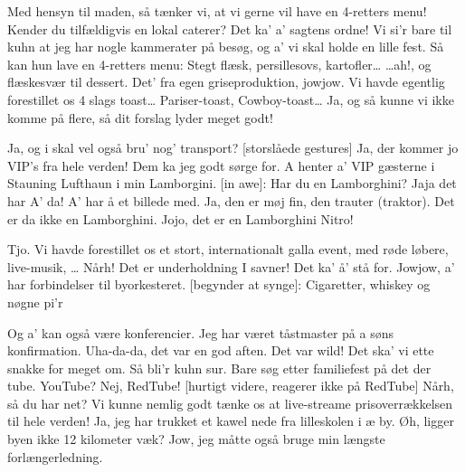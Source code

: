 \documentclass[a4paper,11pt]{article}
\begin{document}
\begin{sketch}
 Med hensyn til maden, så tænker vi, at vi gerne vil have en 4-retters menu! Kender du tilfældigvis en lokal caterer?
 Det ka' a' sagtens ordne! Vi si'r bare til kuhn at jeg har nogle
         kammerater på besøg, og a' vi skal holde en lille fest. Så kan hun lave en 4-retters menu:
 Stegt flæsk, persillesovs, kartofler\ldots {} {\ldots}ah!, og flæskesvær til dessert. Det' fra egen griseproduktion, jowjow.
 Vi havde egentlig forestillet os 4 slags toast\ldots
     Pariser-toast, Cowboy-toast\ldots
    Ja, og så kunne vi ikke komme på flere, så dit forslag lyder meget godt!

 Ja, og i skal vel også bru' nog' transport?
[storslåede gestures] Ja, der kommer jo VIP's fra hele verden!
 Dem ka jeg godt sørge for. A henter a' VIP gæsterne i Stauning Lufthaun i min Lamborgini.
[in awe]: Har du en Lamborghini?
 Jaja det har A' da! A' har å et billede med.
 Ja, den er møj fin, den trauter (traktor).
 Det er da ikke en Lamborghini.
 Jojo, det er en Lamborghini Nitro!

 Tjo. Vi havde forestillet os et stort, internationalt galla event, med røde løbere, live-musik, \ldots
{} Nårh! Det er underholdning I savner! Det ka' å' stå for.
 Jowjow, a' har forbindelser til byorkesteret.
[begynder at synge]: Cigaretter, whiskey og nøgne pi'r

 Og a' kan også være konferencier. Jeg har været tåstmaster på a søns konfirmation.
 Uha-da-da, det var en god aften. Det var wild!
 Det ska' vi ette snakke for meget om.  Så bli'r kuhn sur.
         Bare søg etter familiefest på det der tube.
 YouTube?
 Nej, RedTube!
[hurtigt videre, reagerer ikke på RedTube] Nårh, så du har net?
         Vi kunne nemlig godt tænke os at live-streame prisoverrækkelsen til hele verden!
 Ja, jeg har trukket et kawel nede fra lilleskolen i æ by.
 Øh, ligger byen ikke 12 kilometer væk?
 Jow, jeg måtte også bruge min længste forlængerledning.


\end{sketch}
\end{document}
